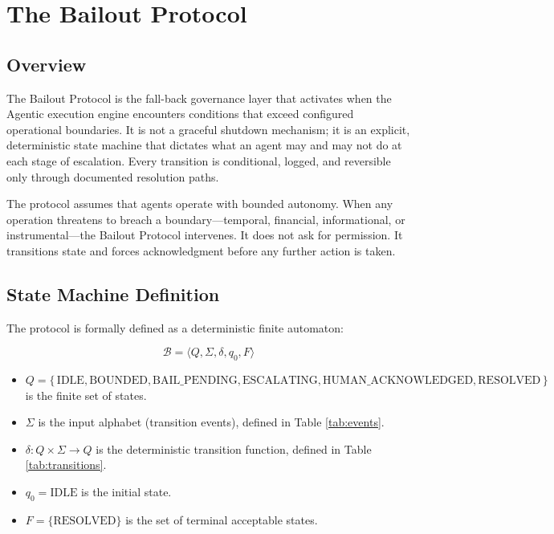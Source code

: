 \section{The Bailout Protocol}

\subsection{Overview}

The Bailout Protocol is the fall-back governance layer that activates when the Agentic execution engine encounters conditions that exceed configured operational boundaries. It is not a graceful shutdown mechanism; it is an explicit, deterministic state machine that dictates what an agent may and may not do at each stage of escalation. Every transition is conditional, logged, and reversible only through documented resolution paths.

The protocol assumes that agents operate with bounded autonomy. When any operation threatens to breach a boundary—temporal, financial, informational, or instrumental—the Bailout Protocol intervenes. It does not ask for permission. It transitions state and forces acknowledgment before any further action is taken.


\subsection{State Machine Definition}

The protocol is formally defined as a deterministic finite automaton:

\[
\mathcal{B} = \langle Q, \Sigma, \delta, q_0, F \rangle
\]

\begin{itemize}
  \item $Q = \{\,\text{IDLE}, \text{BOUNDED}, \text{BAIL\_PENDING}, \text{ESCALATING}, \text{HUMAN\_ACKNOWLEDGED}, \text{RESOLVED}\,\}$ is the finite set of states.
  \item $\Sigma$ is the input alphabet (transition events), defined in Table \ref{tab:events}.
  \item $\delta: Q \times \Sigma \to Q$ is the deterministic transition function, defined in Table \ref{tab:transitions}.
  \item $q_0 = \text{IDLE}$ is the initial state.
  \item $F = \{\text{RESOLVED}\}$ is the set of terminal acceptable states.
\end{itemize}

